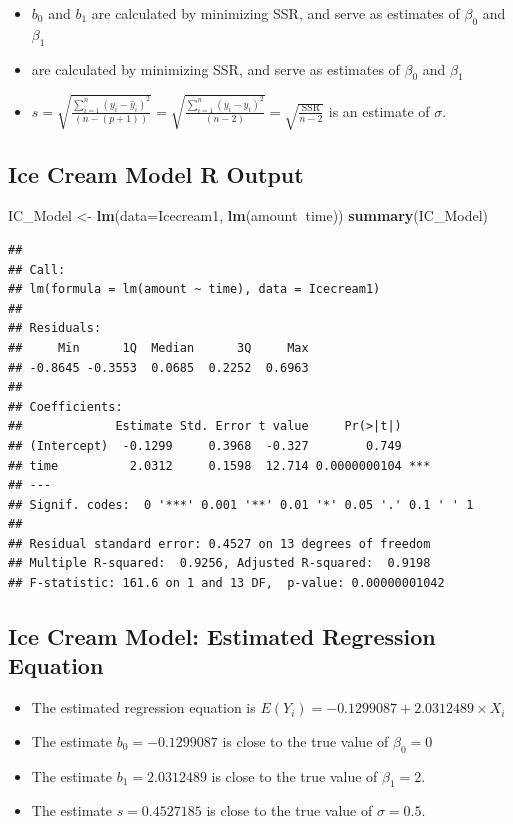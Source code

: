 \documentclass[]{book}
\newenvironment{Shaded}{\begin{snugshade}}{\end{snugshade}}
\newcommand{\KeywordTok}[1]{\textcolor[rgb]{0.13,0.29,0.53}{\textbf{#1}}}
\newcommand{\DataTypeTok}[1]{\textcolor[rgb]{0.13,0.29,0.53}{#1}}
\newcommand{\StringTok}[1]{\textcolor[rgb]{0.31,0.60,0.02}{#1}}
\newcommand{\OperatorTok}[1]{\textcolor[rgb]{0.81,0.36,0.00}{\textbf{#1}}}
\newcommand{\NormalTok}[1]{#1}
\providecommand{\tightlist}{%
  \setlength{\itemsep}{0pt}\setlength{\parskip}{0pt}}
\begin{document}
\begin{itemize}
\tightlist
\item
  \(b_0\) and \(b_1\) are calculated by minimizing SSR, and serve as
  estimates of \(\beta_0\) and \(\beta_1\)
\item
  are calculated by minimizing SSR, and serve as estimates of
  \(\beta_0\) and \(\beta_1\)
\item
  \(s=\sqrt{\frac{\displaystyle\sum_{i=1}^n(y_i-\hat{y}_i)^2}{(n-(p+1))}} = \sqrt{\frac{\displaystyle\sum_{i=1}^n(y_i-\hat{y}_i)^2}{(n-2)}} = \sqrt{\frac{\text{SSR}}{n-2}}\)
  is an estimate of \(\sigma\).
\end{itemize}

\subsection{Ice Cream Model R Output}\label{ice-cream-model-r-output}

\begin{Shaded}
\begin{Highlighting}[]
\NormalTok{IC_Model <-}\StringTok{ }\KeywordTok{lm}\NormalTok{(}\DataTypeTok{data=}\NormalTok{Icecream1, }\KeywordTok{lm}\NormalTok{(amount}\OperatorTok{~}\NormalTok{time))}
\KeywordTok{summary}\NormalTok{(IC_Model)}
\end{Highlighting}
\end{Shaded}

\begin{verbatim}
## 
## Call:
## lm(formula = lm(amount ~ time), data = Icecream1)
## 
## Residuals:
##     Min      1Q  Median      3Q     Max 
## -0.8645 -0.3553  0.0685  0.2252  0.6963 
## 
## Coefficients:
##             Estimate Std. Error t value     Pr(>|t|)    
## (Intercept)  -0.1299     0.3968  -0.327        0.749    
## time          2.0312     0.1598  12.714 0.0000000104 ***
## ---
## Signif. codes:  0 '***' 0.001 '**' 0.01 '*' 0.05 '.' 0.1 ' ' 1
## 
## Residual standard error: 0.4527 on 13 degrees of freedom
## Multiple R-squared:  0.9256, Adjusted R-squared:  0.9198 
## F-statistic: 161.6 on 1 and 13 DF,  p-value: 0.00000001042
\end{verbatim}

\subsection{Ice Cream Model: Estimated Regression
Equation}\label{ice-cream-model-estimated-regression-equation}

\begin{itemize}
\item
  The estimated regression equation is
  \(E(Y_i) = -0.1299087 + 2.0312489\times X_i\)
\item
  The estimate \(b_0 = -0.1299087\) is close to the true value of
  \(\beta_0 = 0\)\\
\item
  The estimate \(b_1 = 2.0312489\) is close to the true value of
  \(\beta_1 = 2\).
\item
  The estimate \(s = 0.4527185\) is close to the true value of
  \(\sigma = 0.5\).
\end{itemize}
\end{document}
